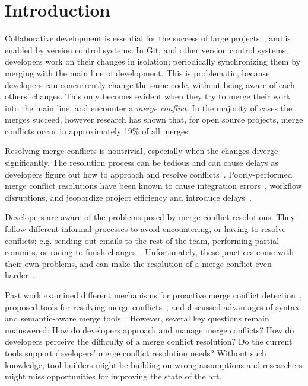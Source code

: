 
\section{Introduction}\label{introduction}

Collaborative development is essential for the success of large projects~\cite{hattori2010syde}, and is enabled by version control systems. 
In Git, and other version control systems, developers work on their changes in isolation; periodically synchronizing them by merging with the main line of development. 
This is problematic, because developers can concurrently change the same code, without being aware of each others' changes.
This only becomes evident when they try to merge their work into the main line, and encounter a \emph{merge conflict.}
In the majority of cases the merges succeed, however research has shown \cite{cassandra,Brun2011} that, for open source projects, merge conflicts occur in approximately 19\% of all merges.

Resolving merge conflicts is nontrivial, especially when the changes diverge significantly.
The resolution process can be tedious and can cause delays as developers figure out how to approach and resolve conflicts~\cite{cassandra}. 
Poorly-performed merge conflict resolutions have been known to cause integration errors~\cite{bird-branches-conflict}, workflow disruptions, and jeopardize project efficiency and introduce delays~\cite{estler2014awareness}. 

Developers are aware of the problems posed by merge conflict resolutions.
They follow different informal processes to avoid encountering, or having to resolve conflicts; e.g. sending out emails to the rest of the team, performing partial commits, or racing to finish changes~\cite{deSouza2003breaking,cataldo2008distributed_dev}.
Unfortunately, these practices come with their own problems, and can make the resolution of a merge conflict even harder~\cite{Brun2011}. 

Past work examined different mechanisms for proactive merge conflict detection~\cite{Brun2011,palantir,Guimaraes}, proposed tools for resolving merge conflicts~\cite{nishimura,mens2002state}, and discussed advantages of syntax- and semantic-aware merge tools~\cite{danny_refactorings,hunt2002extensible,apel_semistructured_2011}. 
However, several key questions remain unanswered: 
How do developers approach and manage merge conflicts?
How do developers perceive the difficulty of a merge conflict resolution? 
Do the current tools support developers' merge conflict resolution needs?
Without such knowledge, tool builders might be building on wrong assumptions and researchers might miss opportunities for improving the state of the art.

